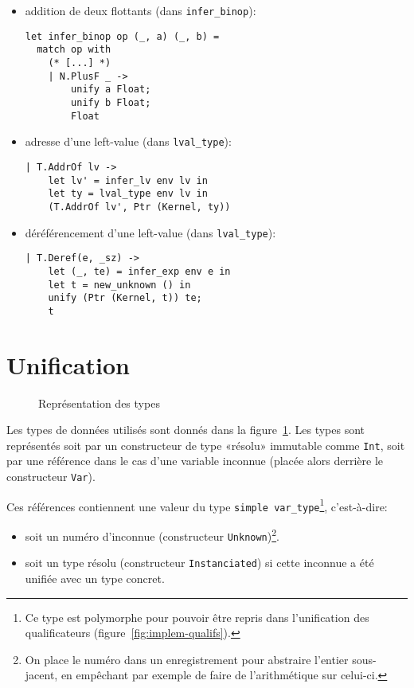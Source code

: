 \begin{itemize}
  \item addition de deux flottants (dans \texttt{infer\_binop}):

\begin{verbatim}
let infer_binop op (_, a) (_, b) =
  match op with
    (* [...] *)
    | N.PlusF _ ->
        unify a Float;
        unify b Float;
        Float
\end{verbatim}

  \item adresse d'une left-value (dans \texttt{lval\_type}):

\begin{verbatim}
| T.AddrOf lv ->
    let lv' = infer_lv env lv in
    let ty = lval_type env lv in
    (T.AddrOf lv', Ptr (Kernel, ty))
\end{verbatim}

  \item déréférencement d'une left-value (dans \texttt{lval\_type}):

\begin{verbatim}
| T.Deref(e, _sz) ->
    let (_, te) = infer_exp env e in
    let t = new_unknown () in
    unify (Ptr (Kernel, t)) te;
    t
\end{verbatim}

\end{itemize}

\section{Unification}

\begin{figure}
\caption{Représentation des types}
\label{fig:implem-typ}
\end{figure}

Les types de données utilisés sont donnés dans la figure~\ref{fig:implem-typ}.
Les types \langname{} sont représentés soit par un constructeur de type
«résolu» immutable comme \texttt{Int}, soit par une référence dans le cas
d'une variable inconnue (placée alors derrière le constructeur \texttt{Var}).

Ces références contiennent une valeur du type
\texttt{simple var\_type}\footnote{
  Ce type est polymorphe pour pouvoir être repris dans l'unification des
  qualificateurs (figure~\ref{fig:implem-qualifs}).
}, c'est-à-dire:

\begin{itemize}
\item soit un numéro d'inconnue (constructeur \texttt{Unknown})\footnote{On
  place le numéro dans un enregistrement pour abstraire l'entier sous-jacent, en
  empêchant par exemple de faire de l'arithmétique sur celui-ci.}.

\item soit un type résolu (constructeur \texttt{Instanciated}) si cette
  inconnue a été unifiée avec un type concret.
\end{itemize}

